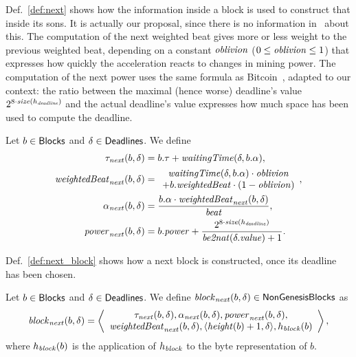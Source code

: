 Def.~\ref{def:next} shows how the information inside a block is used to construct
that inside its sons. It is actually our proposal, since there is no information
in~\cite{SignumPlotting} about this. The computation of the next weighted beat
gives more or less weight to the previous weighted beat, depending on a constant ${\mathit{oblivion}}$
($0\le{\mathit{oblivion}}\le 1$) that expresses how quickly the acceleration reacts to changes
in mining power. The computation of the next power uses the same formula
as Bitcoin~\cite{WalkerG24,GarayKL17}, adapted to our context: the ratio between the maximal (hence worse)
deadline's value $2^{8\cdot{\mathit{size}}(h_{\mathit{deadline}})}$ and the actual deadline's value
expresses how much space has been used to compute the deadline.
%
\begin{definition}\label{def:next}
  Let $b\in{\mathsf{Blocks}}$ and $\delta\in{\mathsf{Deadlines}}$. We define
  \begin{align*}
    \tau_{\mathit{next}}(b,\delta)&=b.\tau+{\mathit{waitingTime}}(\delta,b.\alpha),\\
    \mathit{weightedBeat}_{\mathit{next}}(b,\delta)&=\begin{array}{c}
    {\mathit{waitingTime}}(\delta,b.\alpha)\cdot{\mathit{oblivion}}\\
    +b.\mathit{weightedBeat}\cdot(1-{\mathit{oblivion}})
    \end{array},\\
    \alpha_{\mathit{next}}(b,\delta)&=\frac{b.\alpha\cdot\mathit{weightedBeat}_{\mathit{next}}(b,\delta)}{{\mathit{beat}}},\\
    {\mathit{power}}_{\mathit{next}}(b,\delta)&=b.{\mathit{power}}+\frac{2^{8\cdot{\mathit{size}}(h_{\mathit{deadline}})}}{{\mathit{be2nat}}(\delta.\mathit{value})+1}.
  \end{align*}
\end{definition}
%
Def.~\ref{def:next_block} shows how a next block is constructed, once
its deadline has been chosen.
%
\begin{definition}\label{def:next_block}
  Let $b\in{\mathsf{Blocks}}$ and $\delta\in{\mathsf{Deadlines}}$. We define
  ${\mathit{block}}_{\mathit{next}}(b,\delta)\in{\mathsf{NonGenesisBlocks}}$ as
  \[
  {\mathit{block}}_{\mathit{next}}(b,\delta)=\left\langle\begin{array}{c}
  \tau_{\mathit{next}}(b,\delta),\alpha_{\mathit{next}}(b,\delta),{\mathit{power}}_{\mathit{next}}(b,\delta),\\
  \mathit{weightedBeat}_{\mathit{next}}(b,\delta),\langle{\mathit{height}}(b)+1,\delta\rangle,h_{\mathit{block}}(b)
  \end{array}\right\rangle,
  \]
  where $h_{\mathit{block}}(b)$ is the application of $h_{\mathit{block}}$ to the byte representation of $b$.
\end{definition}

